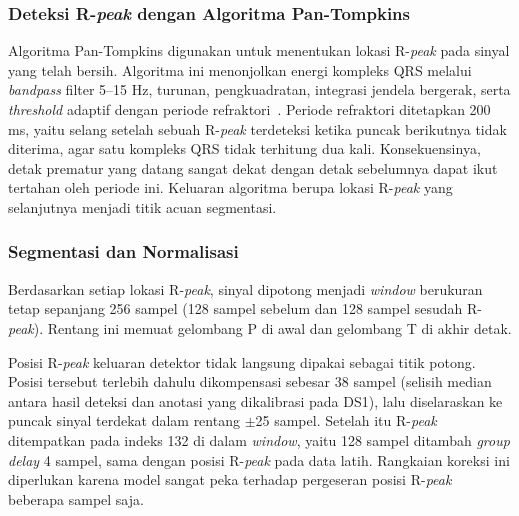 \subsubsection{Deteksi R-\textit{peak} dengan Algoritma Pan-Tompkins}

Algoritma Pan-Tompkins digunakan untuk menentukan lokasi R-\textit{peak} pada sinyal yang telah bersih. Algoritma ini menonjolkan energi kompleks QRS melalui \textit{bandpass} filter 5--15 Hz, turunan, pengkuadratan, integrasi jendela bergerak, serta \textit{threshold} adaptif dengan periode refraktori~\cite{pan_tompkins_1985, li_2020}. Periode refraktori ditetapkan 200 ms, yaitu selang setelah sebuah R-\textit{peak} terdeteksi ketika puncak berikutnya tidak diterima, agar satu kompleks QRS tidak terhitung dua kali. Konsekuensinya, detak prematur yang datang sangat dekat dengan detak sebelumnya dapat ikut tertahan oleh periode ini. Keluaran algoritma berupa lokasi R-\textit{peak} yang selanjutnya menjadi titik acuan segmentasi.

\subsubsection{Segmentasi dan Normalisasi}

Berdasarkan setiap lokasi R-\textit{peak}, sinyal dipotong menjadi \textit{window} berukuran tetap sepanjang 256 sampel (128 sampel sebelum dan 128 sampel sesudah R-\textit{peak}). Rentang ini memuat gelombang P di awal dan gelombang T di akhir detak.

Posisi R-\textit{peak} keluaran detektor tidak langsung dipakai sebagai titik potong. Posisi tersebut terlebih dahulu dikompensasi sebesar 38 sampel (selisih median antara hasil deteksi dan anotasi yang dikalibrasi pada DS1), lalu diselaraskan ke puncak sinyal terdekat dalam rentang $\pm$25 sampel. Setelah itu R-\textit{peak} ditempatkan pada indeks 132 di dalam \textit{window}, yaitu 128 sampel ditambah \textit{group delay} 4 sampel, sama dengan posisi R-\textit{peak} pada data latih. Rangkaian koreksi ini diperlukan karena model sangat peka terhadap pergeseran posisi R-\textit{peak} beberapa sampel saja.

